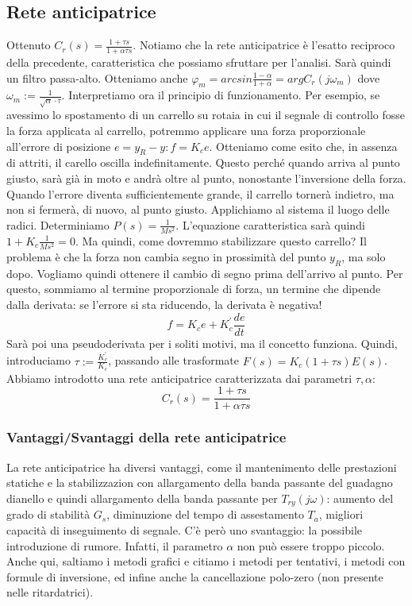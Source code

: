 \documentclass[11pt]{article}
\begin{document}
\subsection{Rete anticipatrice}
Ottenuto $C_r(s)=\frac{1+\tau s}{1+\alpha \tau s}$. Notiamo che la rete anticipatrice è l'esatto reciproco della precedente, caratteristica che possiamo sfruttare per l'analisi. Sarà quindi un filtro passa-alto. Otteniamo anche $\varphi_m = arcsin\frac{1-\alpha}{1+\alpha}=argC_r(j\omega_m)$ dove $\omega_m := \frac{1}{\sqrt{\alpha}\cdot \tau}$. 
Interpretiamo ora il principio di funzionamento. Per esempio, se avessimo lo spostamento di un carrello su rotaia in cui il segnale di controllo fosse la forza applicata al carrello, potremmo applicare una forza proporzionale all'errore di posizione $e=y_R -y : f=K_ce$. Otteniamo come esito che, in assenza di attriti, il carello oscilla indefinitamente. Questo perché quando arriva al punto giusto, sarà già in moto e andrà oltre al punto, nonostante l'inversione della forza. Quando l'errore diventa sufficientemente grande, il carrello tornerà indietro, ma non si fermerà, di nuovo, al punto giusto. 
Applichiamo al sistema il luogo delle radici. Determiniamo $P(s)=\frac{1}{Ms^2}$. L'equazione caratteristica sarà quindi $1+K_c \frac{1}{Ms^2}=0$. Ma quindi, come dovremmo stabilizzare questo carrello? Il problema è che la forza non cambia segno in prossimità del punto $y_R$, ma solo dopo. Vogliamo quindi ottenere il cambio di segno prima dell'arrivo al punto. Per questo, sommiamo al termine proporzionale di forza, un termine che dipende dalla derivata: se l'errore si sta riducendo, la derivata è negativa!
\begin{displaymath}
    f=K_ce+K_c^{'}\frac{de}{dt}
\end{displaymath}
Sarà poi una pseudoderivata per i soliti motivi, ma il concetto funziona. Quindi, introduciamo $\tau:=\frac{K_c^{'}}{K_c}$, passando alle trasformate $F(s)=K_c(1+\tau s)E(s)$. Abbiamo introdotto una rete anticipatrice caratterizzata dai parametri $\tau, \alpha$:
\begin{displaymath}
    C_r(s)=\frac{1+\tau s}{1+\alpha\tau s}
\end{displaymath}
\subsubsection{Vantaggi/Svantaggi della rete anticipatrice}
La rete anticipatrice ha diversi vantaggi, come il mantenimento delle prestazioni statiche e la stabilizzazion con allargamento della banda passante del guadagno dianello e quindi allargamento della banda passante per $T_{ry}(j\omega)$: aumento del grado di stabilità $G_s$, diminuzione del tempo di assestamento $T_a$, migliori capacità di inseguimento di segnale. C'è però uno svantaggio: la possibile introduzione di rumore. Infatti, il parametro $\alpha$ non può essere troppo piccolo. Anche qui, saltiamo i metodi grafici e citiamo i metodi per tentativi, i metodi con formule di inversione, ed infine anche la cancellazione polo-zero (non presente nelle ritardatrici). 
\end{document}
